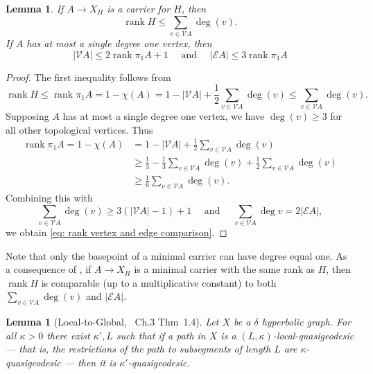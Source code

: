 \documentclass[article, 12pt]{amsart}
\numberwithin{equation}{section}
\newtheorem{lemma}[theorem]{Lemma}
\theoremstyle{definition}
\newcommand{\calE}{\mathcal{E}}
\newcommand{\calV}{\mathcal{V}}
\DeclareMathOperator{\rank}{rank}
\begin{document}
\begin{lemma}\label{lem: rank and topological vertex comparison}
    If $A\to X_H$ is a carrier for $H$, then 
    \begin{equation}
    \rank H\leq \sum_{v\in \calV A}\deg(v).
    \end{equation}
    If $A$ has at most a single degree one vertex, then
    \begin{equation}\label{eq: rank vertex and edge comparison}
    |\calV A|\le 2\rank\pi_1 A +1 \quad \text{ and }\quad 
    |\calE A|\le 3\rank \pi_1 A
    \end{equation}
\end{lemma}
\begin{proof}
    The first inequality follows from
    \[\rank H\leq \rank \pi_1A=1-\chi(A)=1-|\calV A|+\frac 12\sum_{v\in \calV A}\deg(v)\leq \sum_{v\in \calV A}\deg(v).\]
    Supposing $A$ has at most a single degree one vertex, we have $\deg(v)\geq 3$ for all other topological vertices.
    Thus
    \begin{align*}
       \rank \pi_1A=1-\chi(A)&=1-|\calV A|+\frac 12\sum_{v\in \calV A}\deg(v) \\
       &\geq \frac13-\frac13\sum_{v\in\calV A}\deg(v)+\frac 12\sum_{v\in \calV A}\deg(v) \\
       &\geq \frac16\sum_{v\in \calV A}\deg(v).
    \end{align*}
    Combining this with 
    $$\sum_{v\in \calV A}\deg(v)\geq 3(|\calV A|-1)+1\quad \text{ and }\quad\sum_{v\in \calV A}\deg v=2|\calE A|,$$ 
    we obtain \eqref{eq: rank vertex and edge comparison}.
\end{proof}

Note that only the basepoint of a minimal carrier can have degree equal one.
As a consequence of , if $A\to X_H$ is a minimal carrier with the same rank as $H$, then $\rank H$ is comparable (up to a multiplicative constant) to both $\sum_{v\in \calV A}\deg(v)$ and $|\calE A|$.

\begin{lemma}[Local-to-Global, \cite{coornaertDelzantPapadopoulos1990}~Ch.3 Thm~1.4]
\label{local to global}
    Let $X$ be a $\delta$ hyperbolic graph. For all $\kappa>0$ there exist $\kappa',L$ such that if a path in $X$ is a $(L,\kappa)$-local-quasigeodesic --- that is, the restrictions of the path to subsegments of length $L$ are $\kappa$-quasigeodesic --- then it is $\kappa'$-quasigeodesic.
\end{lemma}
\end{document}
